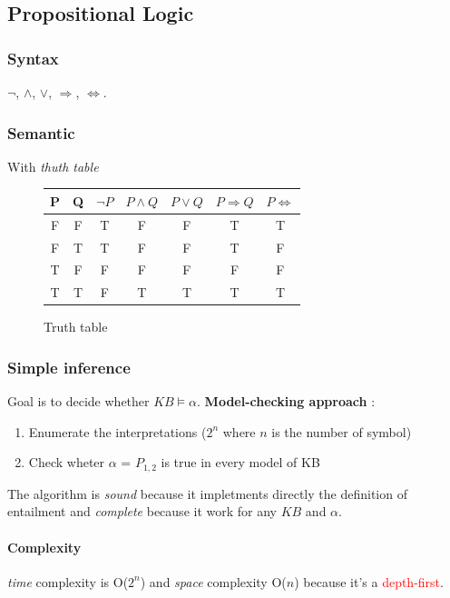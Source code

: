 \subsection{Propositional Logic}

\subsubsection{Syntax}
$\neg$,
$\wedge$,
$\vee$, 
$\Rightarrow$, 
$\Leftrightarrow$.

\subsubsection{Semantic}
With \textit{thuth table}

\begin{figure}[h]
    \centering
    \begin{tabular}{|c|c||c|c|c|c|c|}
        \hline
        P & Q & $\neg P$ & $P \wedge Q$ & $P \vee Q$ & $P \Rightarrow Q$ & $P \Leftrightarrow$ \\
        \hline
        F & F & T & F & F & T & T \\
        F & T & T & F & F & T & F \\
        T & F & F & F & F & F & F \\
        T & T & F & T & T & T & T \\
        \hline
    \end{tabular}
    \caption{Truth table}
\end{figure}


\subsubsection{Simple inference}
Goal is to decide whether $KB \models \alpha$. 
\textbf{Model-checking approach} :
\begin{enumerate}
    \item Enumerate the interpretations ($2^n$ where $n$ is the number of symbol)
    \item Check wheter $\alpha$ = $P_{1,2}$ is true in every model of KB
\end{enumerate}

The algorithm is \textit{sound} because it impletments directly the definition of entailment and \textit{complete} because it work for any $KB$ and $\alpha$.

\paragraph{Complexity} \textit{time} complexity is O($2^n$) and \textit{space} complexity
O($n$) because it's a \textcolor{red}{depth-first}.


